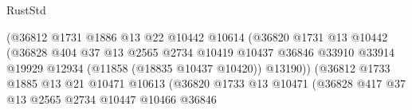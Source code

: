 \begin{lexlean}{RustStd}
\begin{coremodule}
                                              (@36812
                                                @1731
                                                @1886
                                                @13
                                                @22
                                                @10442
                                                @10614
                                                (@36820
                                                  @1731
                                                  @13
                                                  @10442
                                                  (@36828
                                                    @404
                                                    @37
                                                    @13
                                                    @2565
                                                    @2734
                                                    @10419
                                                    @10437
                                                    @36846
                                                    @33910
                                                    @33914
                                                    @19929
                                                    @12934
                                                    (@11858 (@18835 @10437 @10420))
                                                    @13190))
                                                (@36812
                                                  @1733
                                                  @1885
                                                  @13
                                                  @21
                                                  @10471
                                                  @10613
                                                  (@36820
                                                    @1733
                                                    @13
                                                    @10471
                                                    (@36828
                                                      @417
                                                      @37
                                                      @13
                                                      @2565
                                                      @2734
                                                      @10447
                                                      @10466
                                                      @36846

\end{coremodule}
\end{lexlean}
